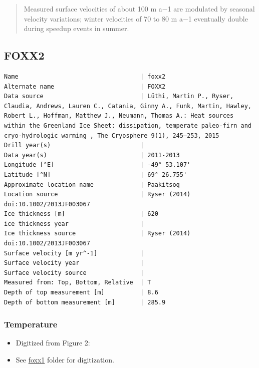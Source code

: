 \documentclass[article,a4paper,times,11pt,twoside]{article}
\begin{document}
\begin{quote}
Measured surface velocities of about 100 m a−1 are
modulated by seasonal velocity variations; winter
velocities of 70 to 80 m a−1 eventually double during
speedup events in summer. 
\end{quote}
\clearpage
\subsection{FOXX2}
\label{sec:org4469298}
\begin{verbatim}
Name                                  | foxx2
Alternate name                        | FOXX2
Data source                           | Lüthi, Martin P., Ryser, Claudia, Andrews, Lauren C., Catania, Ginny A., Funk, Martin, Hawley, Robert L., Hoffman, Matthew J., Neumann, Thomas A.: Heat sources within the Greenland Ice Sheet: dissipation, temperate paleo-firn and cryo-hydrologic warming , The Cryosphere 9(1), 245–253, 2015 
Drill year(s)                         | 
Data year(s)                          | 2011-2013
Longitude [°E]                        | -49° 53.107'
Latitude [°N]                         | 69° 26.755'
Approximate location name             | Paakitsoq
Location source                       | Ryser (2014) doi:10.1002/2013JF003067
Ice thickness [m]                     | 620
ice thickness year                    | 
Ice thickness source                  | Ryser (2014) doi:10.1002/2013JF003067 
Surface velocity [m yr^-1]            | 
Surface velocity year                 | 
Surface velocity source               | 
Measured from: Top, Bottom, Relative  | T
Depth of top measurement [m]          | 8.6
Depth of bottom measurement [m]       | 285.9
\end{verbatim}

\subsubsection{Temperature}
\label{sec:orge497345}

\begin{itemize}
\item Digitized from \textcite{luthi_2015} Figure 2:
\item See \url{foxx1} folder for digitization.
\end{itemize}
\end{document}
